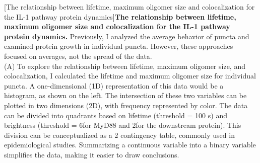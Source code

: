 \begin{centering}
\captionsetup{parbox=none}
[The relationship between lifetime, maximum oligomer size and colocalization for the IL-1 pathway protein dynamics]{\textbf{The relationship between lifetime, maximum oligomer size and colocalization for the IL-1 pathway protein dynamics.} Previously, I analyzed the average behavior of puncta and examined protein growth in individual puncta. However, these approaches focused on averages, not the spread of the data. 
\vspace{1em}
\\
(A) To explore the relationship between lifetime, maximum oligomer size, and colocalization, I calculated the lifetime and maximum oligomer size for individual puncta. A one-dimensional (1D) representation of this data would be a histogram, as shown on the left. The intersection of these two variables can be plotted in two dimensions (2D), with frequency represented by color. The data can be divided into quadrants based on lifetime (threshold = 100 s) and brightness (threshold = 6\times for MyD88 and 2\times for the downstream protein). This division can be conceptualized as a 2 contingency table, commonly used in epidemiological studies. Summarizing a continuous variable into a binary variable simplifies the data, making it easier to draw conclusions.
}
\end{centering}
